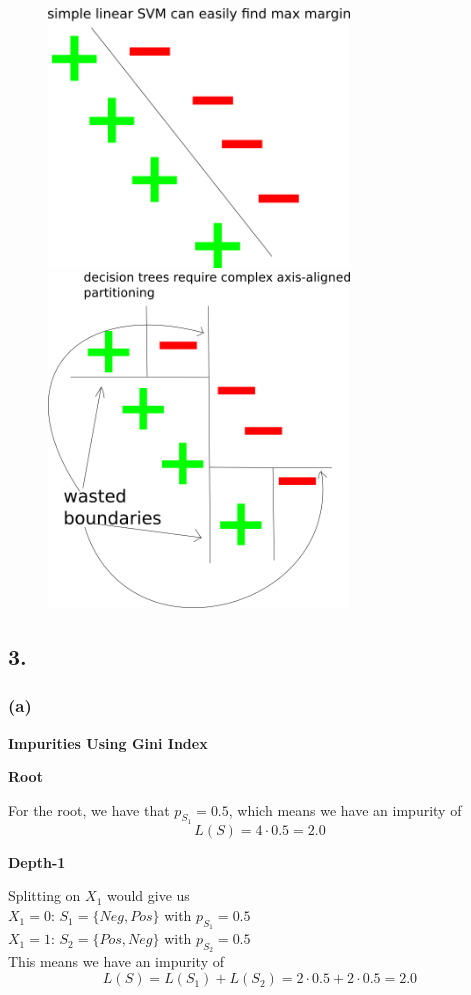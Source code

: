 \documentclass{article}
\begin{document}
\begin{figure}[h]
\includegraphics[width=8cm]{lin}
\includegraphics[width=8cm]{tree}
\end{figure}

\subsection*{3.}
\subsubsection*{(a)}
\textbf{Impurities Using Gini Index}

\noindent \textbf{Root}

For the root, we have that $p_{S_1} = 0.5$, which means we have an impurity of
\[ L(S) = 4 \cdot 0.5 = 2.0 \]

\noindent \textbf{Depth-1}

Splitting on $X_1$ would give us \\
$X_1 = 0$: $S_1 = \{ Neg, Pos \}$ with $p_{S_1} = 0.5$ \\
$X_1 = 1$: $S_2 = \{ Pos, Neg \}$ with $p_{S_2} = 0.5$ \\
This means we have an impurity of
\[ L(S) = L(S_1) + L(S_2) = 2 \cdot 0.5 + 2 \cdot 0.5 = 2.0 \]
\end{document}
